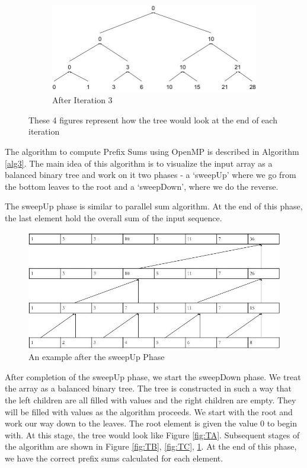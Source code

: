 \documentclass[11pt]{article}
\begin{document}
\begin{figure}[t]
    \begin{subfigure}[h!]{0.49\textwidth}
        \centering
        \includegraphics[width=\textwidth]{sweepDown5}
        \caption{After Iteration 3}
        \label{fig:TD}
    \end{subfigure}
    \caption{These 4 figures represent how the tree would look at the end of each iteration}
    \label{fig: Diff_traces}
\end{figure}

The algorithm to compute Prefix Sums using OpenMP is described in Algorithm \ref{alg3}. The main idea of this algorithm is to visualize the input array as a balanced binary tree and work on it two phases - a `sweepUp' where we go from the bottom leaves to the root and a `sweepDown', where we do the reverse.

The sweepUp phase is similar to parallel sum algorithm. At the end of this phase, the last element hold the overall sum of the input sequence. 

\begin{figure}[h!]
    \centering
        \includegraphics[scale=0.28]{sweepUp.jpg}
        \caption{An example after the sweepUp Phase}
        \label{fig2}
    \centering
\end{figure}

After completion of the sweepUp phase, we start the sweepDown phase. We treat the array as a balanced binary tree. The tree is constructed in such a way that the left children are all filled with values and the right children are empty. They will be filled with values as the algorithm proceeds. We start with the root and work our way down to the leaves. The root element is given the value 0 to begin with. At this stage, the tree would look like Figure \ref{fig:TA}. Subsequent stages of the algorithm are shown in Figure \ref{fig:TB}, \ref{fig:TC}, \ref{fig:TD}. At the end of this phase, we have the correct prefix sums calculated for each element.
\end{document}

